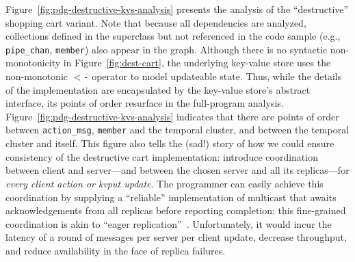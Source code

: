Figure~\ref{fig:pdg-destructive-kvs-analysis} presents the analysis of the 
``destructive'' shopping cart variant.  Note that
because all dependencies are analyzed, collections defined in the superclass
but not referenced in the code sample
(e.g., \texttt{pipe\_chan}, \texttt{member}) also appear in the graph.
Although there is no syntactic
non-monotonicity in 
Figure~\ref{fig:dest-cart}, the underlying key-value store
uses the non-monotonic \texttt{$<$-} operator to model updateable state.
Thus, while the details of the implementation are encapsulated by the key-value
store's abstract interface, its points of order resurface in the full-program analysis.
Figure~\ref{fig:pdg-destructive-kvs-analysis}
indicates that there are
points of order between \texttt{action\_msg}, \texttt{member} and the temporal cluster,
and between the temporal cluster and itself.
This figure also tells the (sad!) story of how we could ensure consistency of
the destructive cart implementation: introduce coordination between client and
server---and between the chosen server and all its replicas---for {\em every
  client action or kvput update}.  The programmer can easily achieve this
coordination by supplying a ``reliable'' implementation of multicast that awaits
acknowledgements from all replicas before reporting completion: this
fine-grained coordination is akin to ``eager replication''~\cite{dangers}.
Unfortunately, it would incur the latency of a round of messages per server per
client update, decrease throughput, and reduce availability in the face of
replica failures.

